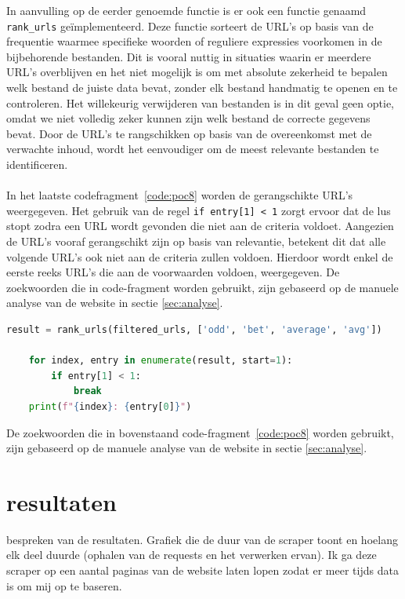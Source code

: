 In aanvulling op de eerder genoemde functie is er ook een functie genaamd \texttt{rank\_urls} geïmplementeerd. Deze functie sorteert de URL's op basis van de frequentie waarmee specifieke woorden of reguliere expressies voorkomen in de bijbehorende bestanden. Dit is vooral nuttig in situaties waarin er meerdere URL's overblijven en het niet mogelijk is om met absolute zekerheid te bepalen welk bestand de juiste data bevat, zonder elk bestand handmatig te openen en te controleren. Het willekeurig verwijderen van bestanden is in dit geval geen optie, omdat we niet volledig zeker kunnen zijn welk bestand de correcte gegevens bevat. Door de URL's te rangschikken op basis van de overeenkomst met de verwachte inhoud, wordt het eenvoudiger om de meest relevante bestanden te identificeren.
\\ \\
In het laatste codefragment~\ref{code:poc8} worden de gerangschikte URL's weergegeven. Het gebruik van de regel \lstinline|if entry[1] < 1| zorgt ervoor dat de lus stopt zodra een URL wordt gevonden die niet aan de criteria voldoet. Aangezien de URL's vooraf gerangschikt zijn op basis van relevantie, betekent dit dat alle volgende URL's ook niet aan de criteria zullen voldoen. Hierdoor wordt enkel de eerste reeks URL's die aan de voorwaarden voldoen, weergegeven.
De zoekwoorden die in code-fragment worden gebruikt, zijn gebaseerd op de manuele analyse van de website in sectie \ref{sec:analyse}.
\begin{lstlisting}[language=python, captionpos=b, caption={Filteren van performance-logs }, label={code:poc8}]
    result = rank_urls(filtered_urls, ['odd', 'bet', 'average', 'avg'])

    for index, entry in enumerate(result, start=1):
        if entry[1] < 1:
            break
    print(f"{index}: {entry[0]}")
\end{lstlisting}

De zoekwoorden die in bovenstaand code-fragment~\ref{code:poc8} worden gebruikt, zijn gebaseerd op de manuele analyse van de website in sectie \ref{sec:analyse}.

\section{resultaten}
bespreken van de resultaten. Grafiek die de duur van de scraper toont en hoelang elk deel duurde (ophalen van de requests en het verwerken ervan). Ik ga deze scraper op een aantal paginas van de website laten lopen zodat er meer tijds data is om mij op te baseren.
\\\\

